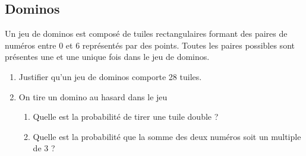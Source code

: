 \documentclass[oneside,12pt]{book}          %
\begin{document}
\subsection{Dominos}
\begin{minipage}{0.65\linewidth}
    Un jeu de dominos est composé de tuiles rectangulaires formant des paires de numéros entre 0 et 6 représentés par des points. Toutes les paires possibles sont présentes une et une unique fois dans le jeu de dominos.

    \begin{enumerate}
        \item Justifier qu'un jeu de dominos comporte 28 tuiles.
        \item On tire un domino au hasard dans le jeu
        \begin{enumerate}
            \item Quelle est la probabilité de tirer une tuile double ?
            \item Quelle est la probabilité que la somme des deux numéros soit un multiple de 3 ?
        \end{enumerate}
    \end{enumerate}
\end{minipage}\hfill
\end{document}
